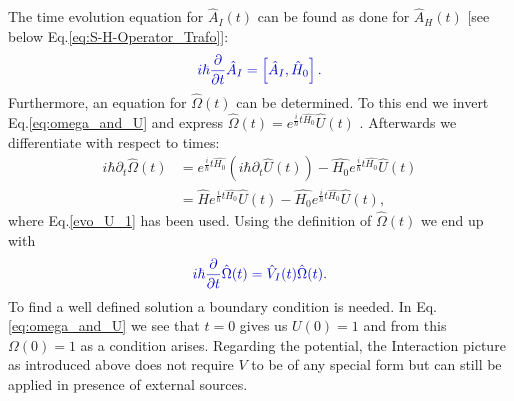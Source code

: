 \documentclass[12pt, titlepage]{article}
\begin{document}
The time evolution equation for $ 	\hat{A}_{I}(t) $ can be found as done for $ \hat{A}_{H}(t) $ $ [ $see below Eq.\enskip\eqref{eq:S-H-Operator_Trafo}]:
\begin{equation}\label{eq:time_evo_equ_Intera}
\textcolor[RGB]{0,0,204}{
	i\hbar
	\frac{\partial}{\partial t}
	\hat{A}_{I}
	=
	\left[ 
	\hat{A}_{I},
	\hat{H}_{0}
	\right] .
}
\end{equation}
Furthermore, an equation for $ \hat{\Omega}(t) $ can be determined. To this end we invert Eq.\enskip\eqref{eq:omega_and_U} and express $  \hat{\Omega}(t) 
  		= e^{\frac{i}{\hbar}t \hat{H_{0}}}
			\hat{U}(t)  $ . Afterwards we differentiate with respect to times: 
\begin{subequations}
\begin{align}
  		i\hbar\partial_{t}\hat{\Omega}(t) 
  		 &= 
  		 e^{\frac{i}{\hbar}t\hat{H_{0}}}
  		 \left(i\hbar\partial_{t}\hat{U}(t) \right)
  		 -
  		 \hat{H_{0}}
   		 e^{\frac{i}{\hbar}t\hat{H_{0}}}
 		 \hat{U}(t)
  		 \\
  		 &=
  		 \hat{H}
  		  e^{\frac{i}{\hbar}t\hat{H_{0}}}  		 
  		 \hat{U}(t)  		 
  		 -
  		 \hat{H_{0}}
  		   e^{\frac{i}{\hbar}t\hat{H_{0}}}
  		 \hat{U}(t),
\end{align}
\end{subequations}
where Eq.\enskip\eqref{evo_U_1} has been used. Using the definition of $ \hat{\Omega}(t) $ we end up with
\begin{equation}\label{eq:time_evo_Omega_interaction}
\textcolor[RGB]{0,0,204}{
	i\hbar
	\frac{\partial}{\partial t}
	\hat{\Omega}(t)
	=
	\hat{V}_{I}(t)
	\hat{\Omega}(t)
.}
\end{equation}
To find a well defined solution a boundary condition is needed. In Eq.\enskip\eqref{eq:omega_and_U} we see that $ t=0 $ gives us $ U(0)=1 $ and from this $ \Omega(0) = 1 $ as a condition arises.
Regarding the potential, the Interaction picture as introduced above does not require $ V $ to be of any special form but can still be applied in presence of external sources. 
\end{document}
